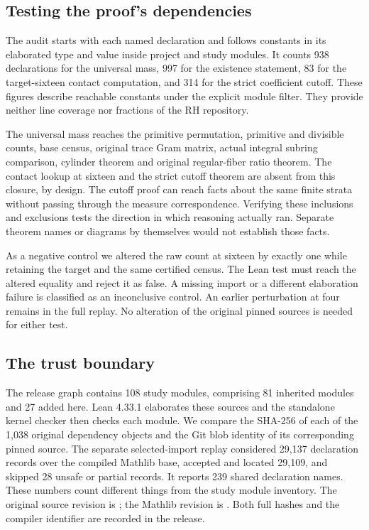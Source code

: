 \documentclass[12pt,letterpaper]{article}
\newcommand{\code}[1]{\texttt{\detokenize{#1}}}
\begin{document}
\subsection{Testing the proof's dependencies}
The audit starts with each named declaration and follows constants in its elaborated type and value inside project and study modules. It counts 938 declarations for the universal mass, 997 for the existence statement, 83 for the target-sixteen contact computation, and 314 for the strict coefficient cutoff. These figures describe reachable constants under the explicit module filter. They provide neither line coverage nor fractions of the RH repository.

The universal mass reaches the primitive permutation, primitive and divisible counts, base census, original trace Gram matrix, actual integral subring comparison, cylinder theorem and original regular-fiber ratio theorem. The contact lookup at sixteen and the strict cutoff theorem are absent from this closure, by design. The cutoff proof can reach facts about the same finite strata without passing through the measure correspondence. Verifying these inclusions and exclusions tests the direction in which reasoning actually ran. Separate theorem names or diagrams by themselves would not establish those facts.

As a negative control we altered the raw count at sixteen by exactly one while retaining the target and the same certified census. The Lean test must reach the altered equality and reject it as false. A missing import or a different elaboration failure is classified as an inconclusive control. An earlier perturbation at four remains in the full replay. No alteration of the original pinned sources is needed for either test.

\subsection{The trust boundary}
The release graph contains 108 study modules, comprising 81 inherited modules and 27 added here. Lean 4.33.1 elaborates these sources and the standalone kernel checker then checks each module. We compare the SHA-256 of each of the 1,038 original dependency objects and the Git blob identity of its corresponding pinned source. The separate selected-import replay considered 29,137 declaration records over the compiled Mathlib base, accepted and located 29,109, and skipped 28 unsafe or partial records. It reports 239 shared declaration names. These numbers count different things from the study module inventory. The original source revision is \code{40e56bab}; the Mathlib revision is \code{0df444a3}. Both full hashes and the compiler identifier are recorded in the release.
\end{document}
